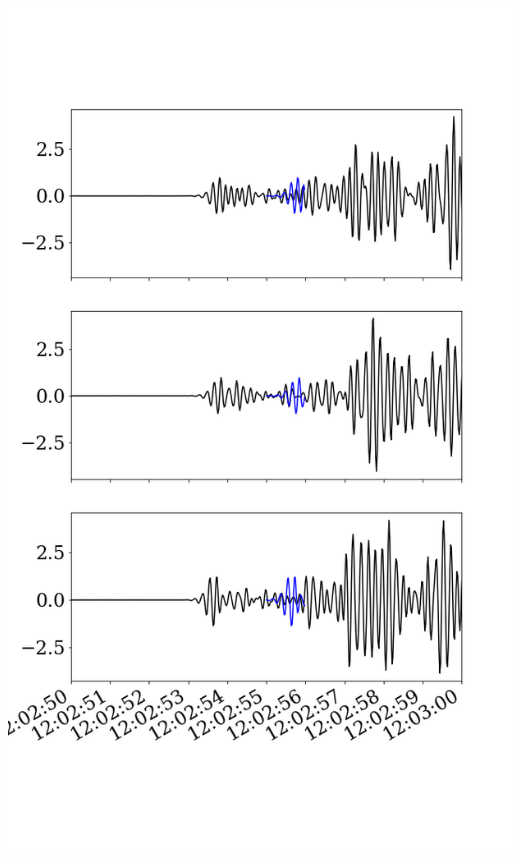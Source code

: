 \documentclass{beamer}
\begin{document}
\begin{frame}
\begin{minipage}{0.4\linewidth}
    \includegraphics[width=1.2\linewidth]{images/fig_5.png}
 \end{minipage}
 
\end{frame}
\end{document}
